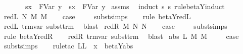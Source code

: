 \begin{isabellebody}
\ \ \ \ \ \ \ {\isachardoublequoteopen}{\isacharparenleft}s{\isacharbrackleft}x\ {\isacharcolon}{\isacharcolon}{\isacharequal}\ FVar\ y{\isacharbrackright}{\isacharparenright}\ {\isasymRightarrow}\ {\isacharparenleft}s{\isacharprime}{\isacharbrackleft}x\ {\isacharcolon}{\isacharcolon}{\isacharequal}\ FVar\ y{\isacharbrackright}{\isacharparenright}{\isachardoublequoteclose}\isanewline
%
\isadelimproof
%
\endisadelimproof
%
\isatagproof
{}\isamarkupfalse%
\ assms\ \isamarkupfalse%
\ {\isacharparenleft}induct\ s\ s{\isacharprime}\ rule{\isacharcolon}beta{\isacharunderscore}Y{\isachardot}induct{\isacharparenright}\isanewline
{}\isamarkupfalse%
\ {\isacharparenleft}red{\isacharunderscore}L\ N\ M\ M{\isacharprime}{\isacharparenright}\isanewline
\ \ \isamarkupfalse%
\ {\isacharquery}case\ \isanewline
\ \ \isamarkupfalse%
\ subst{\isachardot}simps\isanewline
\ \ \isamarkupfalse%
\ {\isacharparenleft}rule\ beta{\isacharunderscore}Y{\isachardot}red{\isacharunderscore}L{\isacharparenright}\isanewline
\ \ \isamarkupfalse%
\ red{\isacharunderscore}L\ trm{\isachardot}var\ subst{\isacharunderscore}trm\ \isamarkupfalse%
\ blast{\isacharplus}\isanewline
{}\isamarkupfalse%
\isanewline
{}\isamarkupfalse%
\ {\isacharparenleft}red{\isacharunderscore}R\ M\ N\ N{\isacharprime}{\isacharparenright}\isanewline
\ \ \isamarkupfalse%
\ {\isacharquery}case\ \isanewline
\ \ \isamarkupfalse%
\ subst{\isachardot}simps\isanewline
\ \ \isamarkupfalse%
\ {\isacharparenleft}rule\ beta{\isacharunderscore}Y{\isachardot}red{\isacharunderscore}R{\isacharparenright}\isanewline
\ \ \isamarkupfalse%
\ red{\isacharunderscore}R\ trm{\isachardot}var\ subst{\isacharunderscore}trm\ \isamarkupfalse%
\ blast{\isacharplus}\isanewline
{}\isamarkupfalse%
\isanewline
{}\isamarkupfalse%
\ {\isacharparenleft}abs\ L\ M\ M{\isacharprime}{\isacharparenright}\ \isanewline
\ \ \isamarkupfalse%
\ {\isacharquery}case\isanewline
\ \ \isamarkupfalse%
\ subst{\isachardot}simps\isanewline
\ \ \isamarkupfalse%
\ {\isacharparenleft}rule{\isacharunderscore}tac\ L{\isacharequal}{\isachardoublequoteopen}L\ {\isasymunion}\ {\isacharbraceleft}x{\isacharbraceright}{\isachardoublequoteclose}\ \ beta{\isacharunderscore}Y{\isachardot}abs{\isacharparenright}\isanewline

\end{isabellebody}
